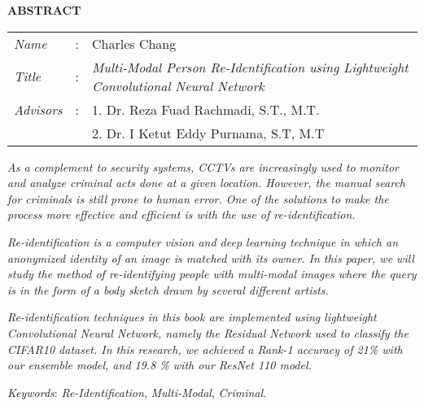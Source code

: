 \begin{center}
  \large\textbf{ABSTRACT}
\end{center}


\vspace{2ex}

\begingroup
  \setlength{\tabcolsep}{0pt}

  \noindent
  \begin{tabularx}{\textwidth}{l >{\centering}m{3em} X}
    \emph{Name}     &:& Charles Chang \\

    \emph{Title}    &:& \emph{Multi-Modal Person Re-Identification using Lightweight Convolutional Neural Network} \\

    \emph{Advisors} &:& 1. Dr. Reza Fuad Rachmadi, S.T., M.T. \\
                    & & 2. Dr. I Ketut Eddy Purnama, S.T, M.T \\
  \end{tabularx}
\endgroup

\emph{As a complement to security systems, CCTVs are increasingly used to monitor and analyze criminal acts done at a given location. However, the manual search for criminals is still prone to human error. One of the solutions to make the process more effective and efficient is with the use of re-identification.}

\emph{Re-identification is a computer vision and deep learning technique in which an anonymized identity of an image is matched with its owner. In this paper, we will study the method of re-identifying people with multi-modal images where the query is in the form of a body sketch drawn by several different artists.}

\emph{Re-identification techniques in this book are implemented using lightweight Convolutional Neural Network, namely the Residual Network used to classify the CIFAR10 dataset. In this research, we achieved a Rank-1 accuracy of 21\% with our ensemble model, and 19.8 \% with our ResNet 110 model.}

\emph{Keywords}: \emph{Re-Identification}, \emph{Multi-Modal}, \emph{Criminal}.
